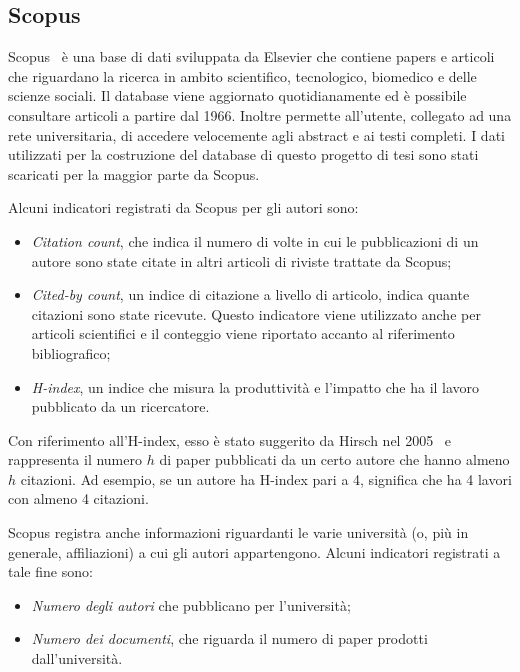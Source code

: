 
\subsection{Scopus}\label{sec:scopus}

Scopus~\cite{scopus} è una base di dati sviluppata da Elsevier che contiene
papers e articoli che riguardano la ricerca in ambito scientifico, tecnologico,
biomedico e delle scienze sociali. Il database viene aggiornato quotidianamente
ed è possibile consultare articoli a partire dal 1966. Inoltre permette
all'utente, collegato ad una rete universitaria, di accedere velocemente agli
abstract e ai testi completi.
I dati utilizzati per la costruzione del database di questo progetto di tesi sono stati scaricati per la maggior parte da Scopus. 

Alcuni indicatori registrati da Scopus per gli autori sono:
\begin{itemize}
    \item \textit{Citation count}, che indica il numero di volte in cui le
    pubblicazioni di un autore sono state citate in altri articoli di riviste
    trattate da Scopus;
    \item \textit{Cited-by count}, un indice di citazione a livello di articolo,
    indica quante citazioni sono state ricevute. Questo indicatore viene
    utilizzato anche per articoli scientifici e il conteggio viene riportato
    accanto al riferimento bibliografico;
    \item \textit{H-index}, un indice che misura la produttività e l'impatto che
    ha il lavoro pubblicato da un ricercatore.
\end{itemize}

Con riferimento all'H-index, esso è stato suggerito da Hirsch nel 2005~\cite{hirsch2005}
e rappresenta il numero $h$ di paper pubblicati da un certo autore che hanno
almeno $h$ citazioni. Ad esempio, se un autore ha H-index pari a 4, significa
che ha 4 lavori con almeno 4 citazioni.

Scopus registra anche informazioni riguardanti le varie università (o, più
in generale, affiliazioni) a cui gli autori appartengono. Alcuni indicatori
registrati a tale fine sono:
\begin{itemize}
    \item \textit{Numero degli autori} che pubblicano per l'università;
    \item \textit{Numero dei documenti}, che riguarda il numero di paper prodotti dall'università.
\end{itemize}


